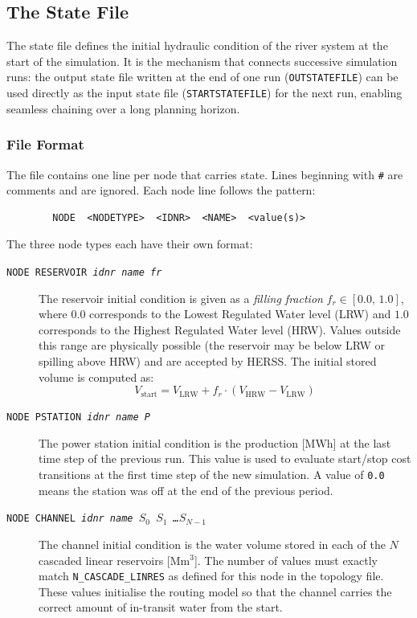 \documentclass[a4paper, 12pt]{report}
\begin{document}
	
	\subsection{The State File}
	\label{sec:statefile}
	
	The state file defines the initial hydraulic condition of the river system at the start of
	the simulation. It is the mechanism that connects successive simulation runs: the output
	state file written at the end of one run (\texttt{OUTSTATEFILE}) can be used directly as
	the input state file (\texttt{STARTSTATEFILE}) for the next run, enabling seamless
	chaining over a long planning horizon.
	
	\subsubsection{File Format}
	
	The file contains one line per node that carries state. Lines beginning with \texttt{\#}
	are comments and are ignored. Each node line follows the pattern:
	
	\begin{verbatim}
		NODE  <NODETYPE>  <IDNR>  <NAME>  <value(s)>
	\end{verbatim}
	
	The three node types each have their own format:
	
	\begin{description}
		\item[\texttt{NODE RESERVOIR \textnormal{\textit{idnr name fr}}}]
		The reservoir initial condition is given as a \emph{filling fraction}
		$f_r \in [0.0,\, 1.0]$, where $0.0$ corresponds to the Lowest Regulated Water
		level (LRW) and $1.0$ corresponds to the Highest Regulated Water level (HRW).
		Values outside this range are physically possible (the reservoir may be below LRW
		or spilling above HRW) and are accepted by HERSS. The initial stored volume is
		computed as:
		\[
		V_\mathrm{start} = V_\mathrm{LRW} + f_r \cdot (V_\mathrm{HRW} - V_\mathrm{LRW})
		\]
		
		\item[\texttt{NODE PSTATION \textnormal{\textit{idnr name P}}}]
		The power station initial condition is the production [MWh] at the last time step
		of the previous run. This value is used to evaluate start/stop cost transitions
		at the first time step of the new simulation. A value of \texttt{0.0} means the
		station was off at the end of the previous period.
		
		\item[\texttt{NODE CHANNEL \textnormal{\textit{idnr name $S_0$ $S_1$ \ldots $S_{N-1}$}}}]
		The channel initial condition is the water volume stored in each of the $N$
		cascaded linear reservoirs [Mm$^3$]. The number of values must exactly match
		\texttt{N\_CASCADE\_LINRES} as defined for this node in the topology file.
		These values initialise the routing model so that the channel carries the correct
		amount of in-transit water from the start.
	\end{description}
	
\end{document}
